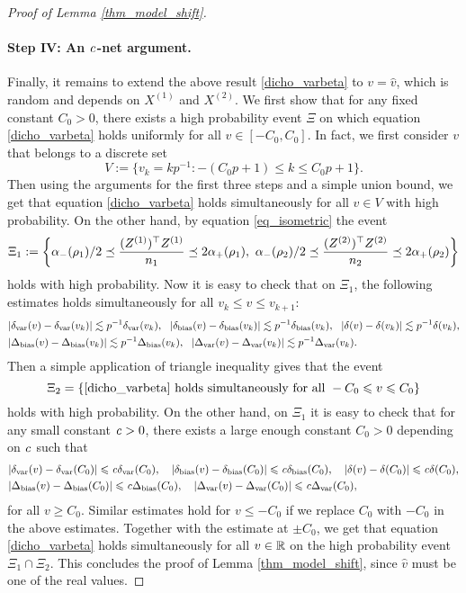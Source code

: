 \begin{proof}[Proof of Lemma \ref{thm_model_shift}]
\paragraph{Step IV: An $\e$-net argument.} Finally, it remains to extend the above result \eqref{dicho_varbeta} to $v=\hat v$, which is random and depends on $X^{(1)}$ and $X^{(2)}$. We first show that for any fixed constant $C_0>0$, there exists a high probability event $\Xi$ on which equation \eqref{dicho_varbeta}
holds uniformly for all $v\in [-C_0, C_0]$. In fact, we first consider $v$ that belongs to a discrete set
$$V:=\{v_k = kp^{-1}: -(C_0p +1)\le k \le C_0p +1\}.$$
Then using the arguments for the first three steps and a simple union bound, we get that equation 
\eqref{dicho_varbeta} holds simultaneously for all $v\in V$ with high probability. On the other hand, by equation \eqref{eq_isometric} the event
$$\Xi_1:=\left\{ \al_-(\rho_1)/2 \preceq  \frac{(Z^{(1)})^{\top} Z^{(1)}}{n_1}  \preceq   2\al_+(\rho_1) ,\  \al_-(\rho_2)/2 \preceq  \frac{(Z^{(2)})^\top Z^{(2)}}{n_2}  \preceq   2\al_+(\rho_2)\right\}$$
holds with high probability. Now it is easy to check that on $\Xi_1$, the following estimates holds simultaneously for all $v_k \le v\le v_{k+1}$:
\begin{align*}
& |\delta_{\vari}(v) -\delta_{\vari}(v_k)|\lesssim p^{-1}\delta_{\vari}(v_k),\ \ |\delta_{\bias}(v) -\delta_{\bias}(v_k)|\lesssim p^{-1}\delta_{\bias}(v_k), \ \   |\delta(v)-\delta(v_k)|\lesssim p^{-1}\delta(v_k),\\
& |\Delta_{\bias}(v) -\Delta_{\bias}(v_k)|\lesssim p^{-1}\Delta_{\bias}(v_k),\ \ |\Delta_{\vari}(v) -\Delta_{\vari}(v_k)|\lesssim p^{-1}\Delta_{\vari}(v_k).
\end{align*}
Then a simple application of triangle inequality gives that the event
$$\Xi_2=\{\eqref{dicho_varbeta} \text{ holds simultaneously for all }-C_0\le v \le C_0\}$$
holds with high probability. On the other hand, on $\Xi_1$ it is easy to check that for any small constant $\e>0$, there exists a large enough constant $C_0>0$ depending on $\e$ such that
\begin{align*}
& |\delta_{\vari}(v) -\delta_{\vari}(C_0)|\le \e\delta_{\vari}(C_0),\quad |\delta_{\bias}(v) -\delta_{\bias}(C_0)|\le \e\delta_{\bias}(C_0), \quad  |\delta(v)-\delta(C_0)|\le \e\delta(C_0),\\
& |\Delta_{\bias}(v) -\Delta_{\bias}(C_0)|\le \e\Delta_{\bias}(C_0),\quad |\Delta_{\vari}(v) -\Delta_{\vari}(C_0)|\le \e\Delta_{\vari}(C_0),
\end{align*}
for all $v\ge C_0$. Similar estimates hold for $v\le -C_0$ if we replace $C_0$ with $-C_0$ in the above estimates. Together with the estimate at $\pm C_0$, we get that equation \eqref{dicho_varbeta} holds simultaneously for all $v\in \R$ on the high probability event $\Xi_1\cap \Xi_2$. This concludes the proof of Lemma \ref{thm_model_shift}, since $\hat v$ must be one of the real values.
\end{proof}


